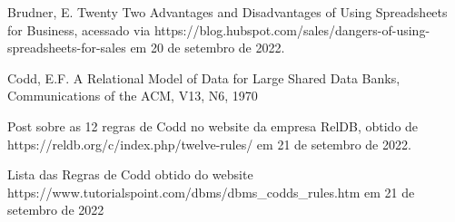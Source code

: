 \documentclass[
12pt,		%
openright,	%
twoside,  %
a4paper,			%
chapter=TITLE,		%
english,			%
french,				%
spanish,			%
brazil				%
]{USPSC-classe/USPSC}
\begin{document}
\begin{flushleft}
\begin{flushleft}
\begin{flushleft}
\begin{flushleft}
[Brudner, 2022] Brudner, E. Twenty Two Advantages and Disadvantages of Using Spreadsheets for Business, acessado via https://blog.hubspot.com/sales/dangers-of-using-spreadsheets-for-sales em 20 de setembro de 2022.
\end{flushleft}


\end{flushleft}


\end{flushleft}


\end{flushleft}


\begin{flushleft}
\begin{flushleft}
\begin{flushleft}
\begin{flushleft}
[CODD, 1970] Codd, E.F. A Relational Model of Data for Large Shared Data Banks, Communications of the ACM, V13, N6, 1970
\end{flushleft}


\end{flushleft}


\end{flushleft}


\end{flushleft}


\begin{flushleft}
\begin{flushleft}
\begin{flushleft}
\begin{flushleft}
[RelDB, 2019] Post sobre as 12 regras de Codd no website da empresa RelDB, obtido de https://reldb.org/c/index.php/twelve-rules/ em 21 de setembro de 2022.
\end{flushleft}


\end{flushleft}


\end{flushleft}


\end{flushleft}


\begin{flushleft}
\begin{flushleft}
\begin{flushleft}
\begin{flushleft}
[TutorialsPoint, 2022] Lista das Regras de Codd obtido do website https://www.tutorialspoint.com/dbms/dbms\_codds\_rules.htm em 21 de setembro de 2022
\end{flushleft}


\end{flushleft}


\end{flushleft}


\end{flushleft}
\end{document}
